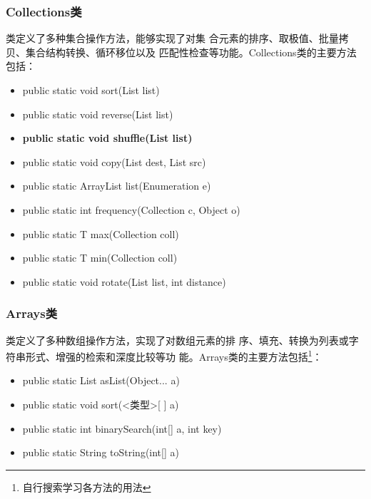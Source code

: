 \begin{frame}[fragile] %
  \frametitle{Collections类}

   类定义了多种集合操作方法，能够实现了对集
  合元素的{\Blue\hei 排序、取极值、批量拷贝、集合结构转换、循环移位以及
    匹配性检查}等功能。Collections类的主要方法包括：

  \begin{itemize}\small
  \item public static void sort(List list)
  \item public static void reverse(List list)
  \item {\Red\bf public static void shuffle(List list)}
  \item public static void copy(List dest, List src)
  \item public static ArrayList list(Enumeration e)
  \item public static int frequency(Collection c, Object o)
  \item public static T max(Collection coll)
  \item public static T min(Collection coll)
  \item public static void rotate(List list, int distance)
  \end{itemize}
\end{frame}

\begin{frame}[fragile] %
  \frametitle{Arrays类}

   类定义了多种数组操作方法，实现了对数组元素的排
  序、填充、转换为列表或字符串形式、增强的检索和深度比较等功
  能。Arrays类的主要方法包括\footnote{自行搜索学习各方法的用法}：

  \begin{itemize}
  \item public static List asList(Object... a)
  \item public static void sort(<类型>[ ] a)
  \item public static int binarySearch(int[] a, int key)
  \item public static String toString(int[] a)
  \end{itemize}
\end{frame}


